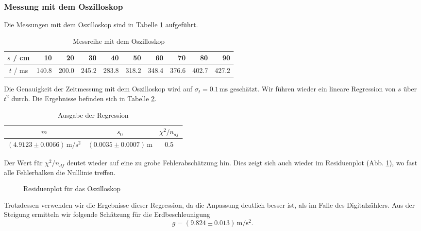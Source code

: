 \documentclass[a4paper, 12pt]{scrartcl}
\begin{document}
\subsubsection{Messung mit dem Oszilloskop}

Die Messungen mit dem Oszilloskop sind in Tabelle \ref{tableOs} aufgeführt. 
\begin{table}[h!]
\begin{center}
\begin{tabular}{c|r|r|r|r|r|r|r|r|r}
$s$ / cm & 10 & 20 & 30 & 40 & 50 & 60 & 70 & 80 & 90 \\
\hline
$t$ / ms & 140.8 & 200.0 & 245.2 & 283.8 & 318.2 & 348.4 & 376.6 & 402.7 & 427.2 \\
\end{tabular}
\caption{Messreihe mit dem Oszilloskop}
\label{tableOs}
\end{center}
\end{table}

Die Genauigkeit der Zeitmessung mit dem Oszilloskop wird auf $\sigma_t = 0.1 \, \mathrm{ms}$ geschätzt. Wir führen wieder ein lineare Regression von $s$ über $t^2$ durch. Die Ergebnisse befinden sich in Tabelle \ref{tableReg2}.

\begin{table}[h!]
\begin{center}
\begin{tabular}{c|c|c}
$m$ & $s_0$ & $\chi^2/n_{df}$ \\
\hline
$(4.9123 \pm 0.0066) \, \mathrm m / \mathrm s^2$ & $(0.0035 \pm 0.0007) \, \mathrm m$ & $0.5$
\end{tabular}
\caption{Ausgabe der Regression}
\label{tableReg2}
\end{center}
\end{table}

Der Wert für $\chi^2/n_{df}$ deutet wieder auf eine zu grobe Fehlerabschätzung hin. Dies zeigt sich auch wieder im Residuenplot (Abb. \ref{ResOz}), wo fast alle Fehlerbalken die Nulllinie treffen.
\begin{figure}[h!]
	\centering
	\caption{Residuenplot für das Oszilloskop}
	\label{ResOz}
\end{figure}
Trotzdessen verwenden wir die Ergebnisse dieser Regression, da die Anpassung deutlich besser ist, als im Falle des Digitalzählers. Aus der Steigung ermitteln wir folgende Schätzung für die Erdbeschleunigung
$$g = (9.824 \pm 0.013) \, \mathrm m / \mathrm s^2 .$$
\end{document}
